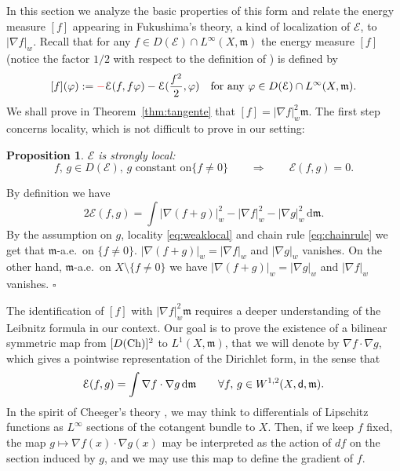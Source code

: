 \documentclass[reqno,11pt]{article}
\numberwithin{equation}{section}
\newcommand{\C}{\mathbb{C}}
\newcommand{\mm}{{\mbox{\boldmath$m$}}}
\newcommand{\sfd}{{\sf d}}
\renewcommand{\d}{{\mathrm d}}
\newenvironment{proof}{\removelastskip\par\medskip   %
\noindent{\em Proof.}
\rm}{\penalty-20\null\hfill$\square$\par\medbreak}
\newtheorem{proposition}[theorem]{Proposition}
\newcommand{\weakgrad}[1]{|\nabla #1|_w}                %
\renewcommand{\C}{{\rm Ch}}
\renewcommand{\mm}{\mathfrak m}
\begin{document}
In this section we analyze the basic properties of this form and
relate the energy measure $[f]$ appearing in Fukushima's theory, a
kind of localization of ${\mathcal E}$, to $\weakgrad{f}$. Recall
that for any $f\in D(\mathcal E)\cap L^\infty(X,\mm)$ the energy
measure $[f]$ (notice the factor $1/2$ with respect to
  the definition of \cite[(3.2.14)]{Fukushima-Oshima-Takeda11})
is defined by
\begin{equation}\label{eq:fuku1}
\mathcal[f](\varphi):={\color{red}-}
{\mathcal E}(f,f\varphi)- {\mathcal E}(\frac
{f^2} 2,\varphi)\quad \text{for any }\varphi\in D(\mathcal E)\cap
L^\infty(X,\mm).
\end{equation}
We shall prove in Theorem~\ref{thm:tangente} that
$[f]=\weakgrad{f}^2\mm$.
The first step concerns locality, which is not difficult to prove in
our setting:
%
\begin{proposition}\label{prop:stronglocal}
$\mathcal E$ is strongly local:
\begin{equation}
\label{eq:strongloc} \text{$f,\,g\in D(\mathcal E)$, $g$ constant on
$\{f\neq 0\}$}\qquad\Rightarrow\qquad\mathcal E(f,g)=0.
\end{equation}
\end{proposition}
\begin{proof}
By definition we have
\begin{equation}
\label{eq:polar}
2\mathcal E(f,g)=\int\weakgrad{(f+g)}^2-\weakgrad f^2-\weakgrad g^2\,\d\mm.
\end{equation}
By the assumption on $g$, locality \eqref{eq:weaklocal} and chain
rule \eqref{eq:chainrule} we get that $\mm$-a.e.~on $\{f\neq 0\}$.
$\weakgrad{(f+g)}=\weakgrad{f}$ and $\weakgrad{g}$ vanishes. On the
other hand, $\mm$-a.e.~on $X\setminus \{f\neq 0\}$ we have
$\weakgrad{(f+g)}=\weakgrad{g}$ and $\weakgrad{f}$ vanishes.
\end{proof}
%
The identification of $[f]$ with $\weakgrad{f}^2\mm$ requires a
deeper understanding of the Leibnitz formula in our context. Our
goal is to prove the existence of a bilinear symmetric map from
$[D(\C)]^2$ to $L^1(X,\mm)$, that we will denote by $\nabla
f\cdot\nabla g$, which gives a pointwise representation of the
Dirichlet form, in the sense that
\[
\mathcal E(f,g)=\int\nabla f\cdot\nabla g\,\d\mm\qquad\forall
f,\,g\in W^{1,2}(X,\sfd,\mm).
\]
In the spirit of Cheeger's theory \cite{Cheeger00}, we may think to
differentials of Lipschitz functions as $L^\infty$ sections of the
cotangent bundle to $X$. Then, if we keep $f$ fixed, the map
$g\mapsto\nabla f(x)\cdot\nabla g(x)$ may be interpreted as the
action of $df$ on the section induced by $g$, and we may use this
map to define the gradient of $f$.
\end{document}
